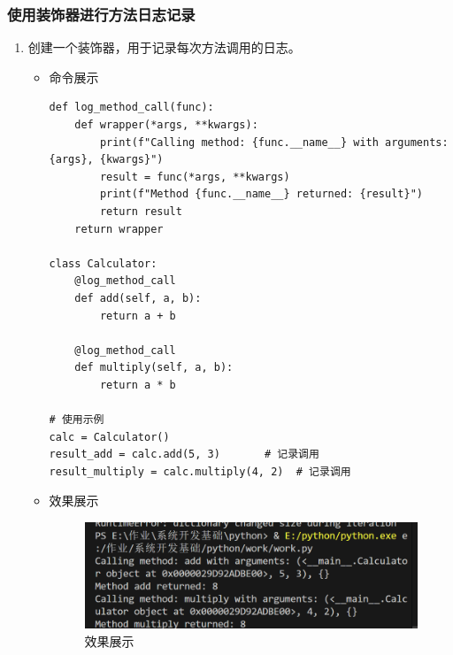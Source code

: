 \documentclass[UTF8]{ctexart}
\begin{document}
\subsubsection{使用装饰器进行方法日志记录 }

\begin{enumerate}
  \item 创建一个装饰器，用于记录每次方法调用的日志。
  \begin{itemize}
  \item 命令展示
  \begin{verbatim}
def log_method_call(func):
    def wrapper(*args, **kwargs):
        print(f"Calling method: {func.__name__} with arguments: {args}, {kwargs}")
        result = func(*args, **kwargs)
        print(f"Method {func.__name__} returned: {result}")
        return result
    return wrapper

class Calculator:
    @log_method_call
    def add(self, a, b):
        return a + b

    @log_method_call
    def multiply(self, a, b):
        return a * b

# 使用示例
calc = Calculator()
result_add = calc.add(5, 3)       # 记录调用
result_multiply = calc.multiply(4, 2)  # 记录调用
 \end{verbatim}

  \item 效果展示
  \begin{figure}[H]
    \centering
    \includegraphics[width=\textwidth]{27} %
    \caption{效果展示}
  
  \end{figure}
\end{itemize}
\end{enumerate}
\end{document}
